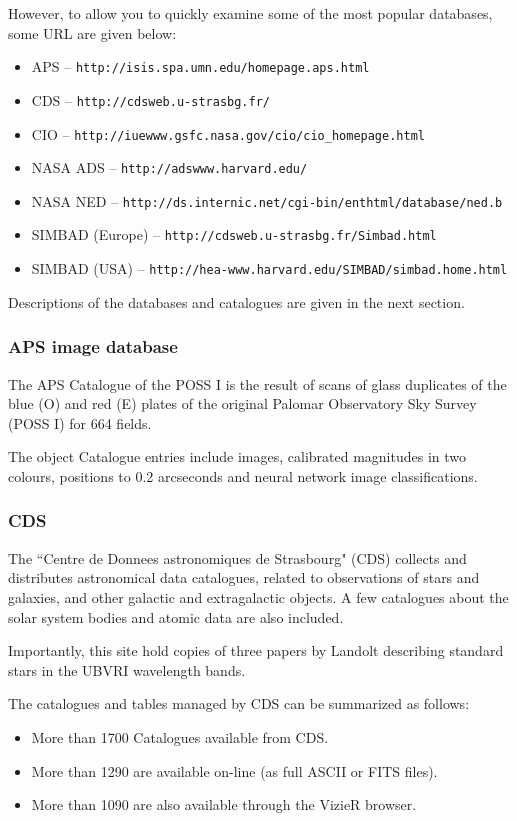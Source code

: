 \documentclass[twoside,11pt]{article}
\newcommand{\htmladdnormallink}[2]{#1}
\newcommand{\xlabel}[1]{}
\newcommand{\HTTPPref}{\htmladdnormallink{\tt http://isis.spa.umn.edu/homepage.aps.html}{http://isis.spa.umn.edu/homepage.aps.html}}
\newcommand{\HTTPQref}{\htmladdnormallink{\tt http://cdsweb.u-strasbg.fr/}{http://cdsweb.u-strasbg.fr/}}
\newcommand{\HTTPRref}{\htmladdnormallink{\tt http://iuewww.gsfc.nasa.gov/cio/cio\_{}homepage.html}{http://iuewww.gsfc.nasa.gov/cio/cio\_{}homepage.html}}
\newcommand{\HTTPSref}{\htmladdnormallink{\tt http://adswww.harvard.edu/}{http://adswww.harvard.edu/}}
\newcommand{\HTTPTref}{\htmladdnormallink{\tt http://ds.internic.net/cgi-bin/enthtml/database/ned.b}{http://ds.internic.net/cgi-bin/enthtml/database/ned.b}}
\newcommand{\HTTPUref}{\htmladdnormallink{\tt http://cdsweb.u-strasbg.fr/Simbad.html}{http://cdsweb.u-strasbg.fr/Simbad.html}}
\newcommand{\HTTPVref}{\htmladdnormallink{\tt http://hea-www.harvard.edu/SIMBAD/simbad.home.html}{http://hea-www.harvard.edu/SIMBAD/simbad.home.html}}
\begin{document}
However, to allow you to quickly examine some of the most popular databases, some
URL are given below:

\begin{itemize}
\item APS -- {\HTTPPref} 
\item CDS -- {\HTTPQref}
\item CIO -- {\HTTPRref} 
\item NASA ADS -- {\HTTPSref} 
\item NASA NED -- {\HTTPTref} 
\item SIMBAD (Europe) -- {\HTTPUref} 
\item SIMBAD (USA) -- {\HTTPVref}  
\end{itemize}

Descriptions of the databases and catalogues are given in the next section.

\subsubsection{APS image database} \xlabel{APS}
\label{sec:aps}
 
The APS Catalogue of the POSS I is the result of scans of glass duplicates of
the blue (O) and red (E) plates of the original Palomar Observatory Sky
Survey (POSS I) for 664 fields.

The object Catalogue entries include images, calibrated magnitudes in two
colours, positions to 0.2 arcseconds and neural network image
classifications. 

\subsubsection{CDS} \xlabel{CDS}
\label{sec:cds}
 
The ``Centre de Donnees astronomiques de Strasbourg" (CDS) collects and distributes
astronomical data catalogues, related to observations of stars and galaxies,
and other galactic and extragalactic objects. A few catalogues about the
solar system bodies and atomic data are also included. 

Importantly, this site hold copies of three papers by Landolt describing standard
stars in the UBVRI wavelength bands. 

The catalogues and tables managed by CDS can be summarized as follows: 

\begin{itemize}
\item  More than 1700 Catalogues available from CDS.
\item  More than 1290 are available on-line (as full ASCII or FITS files).
\item  More than 1090 are also available through the VizieR browser. 
\end{itemize}
\end{document}
